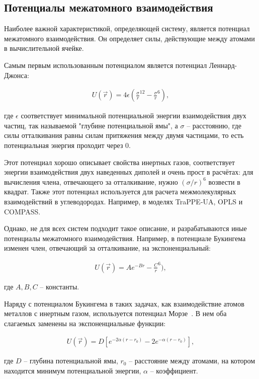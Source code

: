 \subsection{ Потенциалы межатомного взаимодействия}

Наиболее важной характеристикой, определяющей систему, является потенциал межатомного взаимодействия. Он определяет силы, действующие между атомами в вычислительной ячейке.

Самым первым использованным потенциалом является потенциал Леннард-Джонса:

\begin{align}
	U(\overrightarrow{r}) = 4 \epsilon (\frac{\sigma}{r}^{12}-\frac{\sigma}{r}^6),
\end{align}

где $\epsilon$ соответствует минимальной потенциальной энергии взаимодействия двух частиц, так называемой "глубине потенциальной ямы", а $\sigma$ \--- расстоянию, где силы отталкивания равны силам притяжения между двумя частицами, то есть потенциальная энергия проходит через 0.

Этот потенциал хорошо описывает свойства инертных газов, соответствует энергии взаимодействия двух наведенных диполей и очень прост в расчётах: для вычисления члена, отвечающего за отталкивание, нужно $(\sigma / r)^6$ возвести в квадрат. Также этот потенциал используется для расчета межмолекулярных взаимодействий в углеводородах. Например, в моделях TraPPE-UA, OPLS и COMPASS. 

Однако, не для всех систем подходит такое описание, и разрабатываются иные потенциалы межатомного взаимодействия. Например, в потенциале Букингема~\cite{buckingham_1938} изменен член, отвечающий за отталкивание, на экспоненциальный:

\begin{align}
	U(\overrightarrow{r}) = A e^{-B r} - \frac{C}{r}^6),
\end{align}

где $A, B, C$ \--- константы. 

Наряду с потенциалом Букингема в таких задачах, как взаимодействие атомов металлов с инертным газом, используется потенциал Морзе~\cite{}. В нем оба слагаемых заменены на экспоненциальные функции:

\begin{align}
	U(\overrightarrow{r}) = D [e^{-2 \alpha (r - r_0)} - 2 e^{-\alpha (r - r_0)}],
\end{align}

где $D$ \--- глубина потенциальной ямы, $r_0$ \--- расстояние между атомами, на котором находится минимум потенциальной энергии, $\alpha$ \--- коэффициент.

